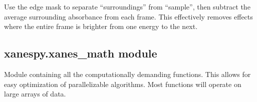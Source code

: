 \documentclass[letterpaper,10pt,english]{sphinxmanual}
\begin{document}
\begin{fulllineitems}
\begin{fulllineitems}
\end{fulllineitems}


\begin{fulllineitems}
\label{\detokenize{xanespy:xanespy.xanes_frameset.XanesFrameset.subtract_surroundings}}
Use the edge mask to separate “surroundings” from “sample”, then
subtract the average surrounding absorbance from each
frame. This effectively removes effects where the entire frame
is brighter from one energy to the next.

\end{fulllineitems}


\end{fulllineitems}



\subsection{xanespy.xanes\_math module}
\label{\detokenize{xanespy:module-xanespy.xanes_math}}\label{\detokenize{xanespy:xanespy-xanes-math-module}}
Module containing all the computationally demanding functions. This
allows for easy optimization of parallelizable algorithms. Most
functions will operate on large arrays of data.
\end{document}
